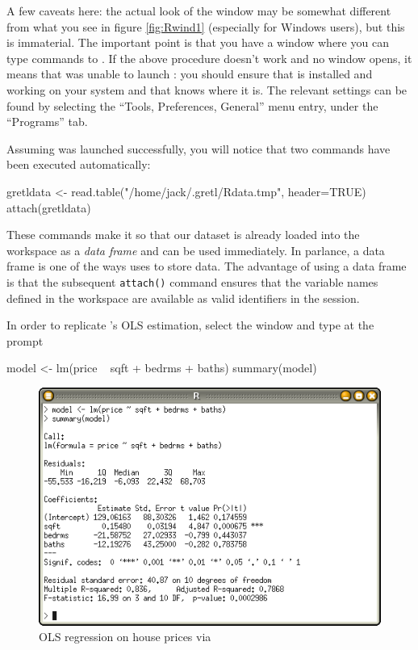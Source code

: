 A few caveats here: the actual look of the  window may be
somewhat different from what you see in figure \ref{fig:Rwind1}
(especially for Windows users), but this is immaterial. The important
point is that you have a window where you can type commands to
. If the above procedure doesn't work and no  window
opens, it means that  was unable to launch : you
should ensure that  is installed and working on your system and
that  knows where it is. The relevant settings can be found
by selecting the ``Tools, Preferences, General'' menu entry, under the
``Programs'' tab.

Assuming  was launched successfully, you will notice that two
commands have been executed automatically:
\begin{code}
  gretldata <- read.table("/home/jack/.gretl/Rdata.tmp", header=TRUE)
  attach(gretldata)
\end{code}
These commands make it so that our dataset is already loaded into the
 workspace as a \emph{data frame} and can be used
immediately. In  parlance, a data frame is one of the ways
 uses to store data. The advantage of using a data frame is
that the subsequent \texttt{attach()} command ensures that the
variable names defined in the  workspace are available as
valid identifiers in the  session.

In order to replicate 's OLS estimation, select the 
window and type at the prompt
\begin{code}
  model <- lm(price ~ sqft + bedrms + baths)
  summary(model)
\end{code}

\begin{figure}[htbp]
  \centering
  \includegraphics[scale=0.7]{figures/Rwindow-2}
  \caption{OLS regression on house prices via }
  \label{fig:Rwind2}
\end{figure}

